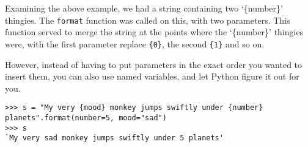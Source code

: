 Examining the above example, we had a string containing two `\{number\}' thingies.      The \texttt{format} function was called on this, with two parameters.    This function served to merge the string at the points where   the `\{number\}' thingies were, with the first parameter replace \texttt{\{0\}}, the second \texttt{\{1\}} and so on.     

However, instead of having to put parameters in the exact order you wanted to insert     them, you can also use named variables, and let Python figure it out for you. 
\begin{lstlisting}
>>> s = "My very {mood} monkey jumps swiftly under {number} planets".format(number=5, mood="sad")
>>> s
`My very sad monkey jumps swiftly under 5 planets'
\end{lstlisting}

